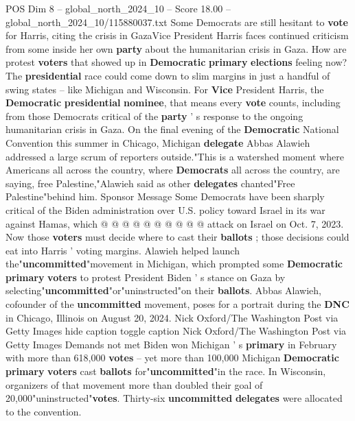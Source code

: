 \begin{textsample}{POS Dim 8 – global\_north\_2024\_10 – Score 18.00 – global\_north\_2024\_10/115880037.txt}  \label{ex:f8_pos_159}
Some Democrats are still hesitant to \textbf{vote} for Harris, citing the crisis in GazaVice President Harris faces continued criticism from some inside her own \textbf{party} about the humanitarian crisis in Gaza.
How are protest \textbf{voters} that showed up in \textbf{Democratic} \textbf{primary} \textbf{elections} feeling now?
The \textbf{presidential} race could come down to slim margins in just a handful of swing states -- like Michigan and Wisconsin.
For \textbf{Vice} President Harris, the \textbf{Democratic} \textbf{presidential} \textbf{nominee}, that means every \textbf{vote} counts, including from those Democrats critical of the \textbf{party} ' s response to the ongoing humanitarian crisis in Gaza.
On the final evening of the \textbf{Democratic} National Convention this summer in Chicago, Michigan \textbf{delegate} Abbas Alawieh addressed a large scrum of reporters outside."This is a watershed moment where Americans all across the country, where \textbf{Democrats} all across the country, are saying, free Palestine,"Alawieh said as other \textbf{delegates} chanted"Free Palestine"behind him.
Sponsor Message Some Democrats have been sharply critical of the Biden administration over U.S. policy toward Israel in its war against Hamas, which @ @ @ @ @ @ @ @ @ @ attack on Israel on Oct. 7, 2023.
Now those \textbf{voters} must decide where to cast their \textbf{ballots} ; those decisions could eat into Harris ' voting margins.
Alawieh helped launch the"\textbf{uncommitted}"movement in Michigan, which prompted some \textbf{Democratic} \textbf{primary} \textbf{voters} to protest President Biden ' s stance on Gaza by selecting"\textbf{uncommitted}"or"uninstructed"on their \textbf{ballots}.
Abbas Alawieh, cofounder of the \textbf{uncommitted} movement, poses for a portrait during the \textbf{DNC} in Chicago, Illinois on August 20, 2024.
Nick Oxford/The Washington Post via Getty Images hide caption toggle caption Nick Oxford/The Washington Post via Getty Images Demands not met Biden won Michigan ' s \textbf{primary} in February with more than 618,000 \textbf{votes} -- yet more than 100,000 Michigan \textbf{Democratic} \textbf{primary} \textbf{voters} cast \textbf{ballots} for"\textbf{uncommitted}"in the race.
In Wisconsin, organizers of that movement more than doubled their goal of 20,000"uninstructed"\textbf{votes}.
Thirty-six \textbf{uncommitted} \textbf{delegates} were allocated to the convention.

\end{textsample}
